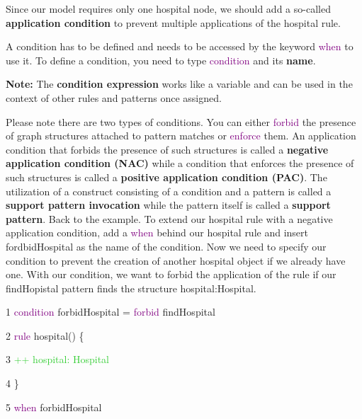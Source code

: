 Since our model requires only one hospital node, we should add a so-called \textbf{application condition} to prevent multiple applications of the hospital rule.\newline

A condition has to be defined and needs to be accessed by the keyword \textcolor{Purple}{when} to use it. To define a condition, you need to type \textcolor{Purple}{condition} and its \textbf{name}.

\textbf{Note:} The \textbf{condition expression} works like a variable and can be used in the context of other rules and patterns once assigned.\newline

Please note there are two types of conditions. You can either \textcolor{Purple}{forbid} the presence of graph structures attached to pattern matches or \textcolor{Purple}{enforce} them.
An application condition that forbids the presence of such structures is called a \textbf{negative application condition (NAC)} while a condition that enforces the presence of such structures is called a \textbf{positive application condition (PAC)}.
\newline
The utilization of a construct consisting of a condition and a pattern is called a \textbf{support pattern invocation} while the pattern itself is called a \textbf{support pattern}.\newline \newline
Back to the example. To extend our hospital rule with a negative application condition, add a \textcolor{Purple}{when} behind our hospital rule and insert \textsf{fordbidHospital} as the name of the condition. Now we need to specify our condition to prevent the creation of another hospital object if we already have one.\newline
With our condition, we want to forbid the application of the rule if our \textsf{findHopistal} pattern finds the structure \textsf{hospital:Hospital}.\newline

{

1 \hspace{0.5cm} \textcolor{Purple}{condition} forbidHospital = \textcolor{Purple}{forbid} findHospital 

2 \hspace{0.5cm} \textcolor{Purple}{rule} hospital() \{ 

3 \hspace{1cm} \textcolor{LimeGreen}{++ hospital: Hospital}

4 \hspace{0.5cm} \}

5 \hspace{0.5cm} \textcolor{Purple}{when} forbidHospital \newline


}

